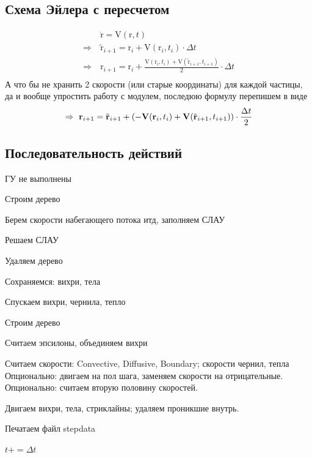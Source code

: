 \documentclass[14pt]{extreport}
\newcommand{\br}[1]{\boldsymbol{\mathrm{#1}}}
\newenvironment{packed_enum}{
\begin{enumerate}
  \setlength{\itemsep}{1pt}
  \setlength{\parskip}{0pt}
  \setlength{\parsep}{0pt}
}{\end{enumerate}}
\begin{document}
\subsection{Схема Эйлера с пересчетом}
\begin{equation*}\begin{split}
&\dot{\br r} = \br V (\br r, t) \\
\Rightarrow~&\tilde{\br r}_{i+1} = \br r_i + \br V(\br r_i, t_i) \cdot \Delta t \\
\Rightarrow~&\br r_{i+1} = \br r_i + 
\frac{\br V(\br r_i, t_i) + \br V( \tilde{\br r}_{i+1}, t_{i+1})}{2}\cdot \Delta t \\
\end{split}\end{equation*}
А что бы не хранить 2 скорости (или старые координаты) для
каждой частицы, да и вообще упростить работу с модулем,
последюю формулу перепишем в виде
\begin{equation*}
\Rightarrow~\br r_{i+1} = \tilde{\br r}_{i+1} + 
\left( -\br V(\br r_i, t_i) + \br V( \tilde{\br r}_{i+1}, t_{i+1}) \right)\cdot \frac{\Delta t}{2} \\
\end{equation*}

\subsection{Последовательность действий}
\begin{packed_enum}
\item ГУ не выполнены\\
\item Строим дерево
\item Берем скорости набегающего потока итд, заполняем СЛАУ
\item Решаем СЛАУ
\item Удаляем дерево\\
\item Сохраняемся: вихри, тела
\item Спускаем вихри, чернила, тепло\\
\item Строим дерево
\item Считаем эпсилоны, объединяем вихри
\item Считаем скорости: Convective, Diffusive, Boundary; скорости чернил, тепла
\subitem Опционально: двигаем на пол шага, заменяем скорости на отрицательные.
\subitem Опционально: считаем вторую половину скоростей.
\item Двигаем вихри, тела, стриклайны; удаляем проникшие внутрь.
\item Печатаем файл stepdata
\item $t += \Delta t$
\end{packed_enum}
\end{document}
